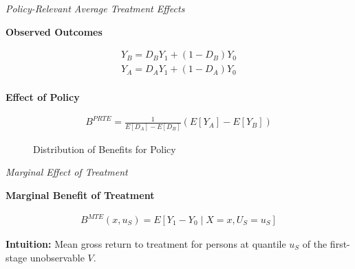 \begin{frame}\begin{center}
\LARGE\textit{Policy-Relevant Average Treatment Effects}
\end{center}\end{frame}
\begin{frame}
\textbf{Observed Outcomes}

\begin{align*}
Y_B = D_B Y_1 + (1 - D_B) Y_0 \\
Y_A = D_A Y_1 + (1 - D_A) Y_0 \\
\end{align*}

\textbf{Effect of Policy}

\begin{align*}
B^{PRTE} = \frac{1}{E[D_A] - E[D_B]} (E[Y_A] - E[Y_B])
\end{align*}

\end{frame}


\begin{frame}
\begin{figure}\caption{Distribution of Benefits for Policy}
\end{figure}
\end{frame}

\begin{frame}\begin{center}
\LARGE\textit{Marginal Effect of Treatment}
\end{center}\end{frame}
\begin{frame}\textbf{Marginal Benefit of Treatment}

\begin{align*}
B^{MTE}(x, u_S) = E [Y_1 - Y_0 \mid X = x, U_S = u_S]
\end{align*}

\textbf{Intuition:} Mean gross return to treatment for persons at
quantile \(u_S\) of the first-stage unobservable \(V\).

\end{frame}

